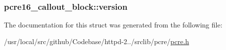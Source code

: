 \subsubsection[{\texorpdfstring{version}{version}}]{ pcre16\+\_\+callout\+\_\+block\+::version}\hypertarget{structpcre16__callout__block_a5b442eb1497b0b109598a4229a13ce49}{}\label{structpcre16__callout__block_a5b442eb1497b0b109598a4229a13ce49}


The documentation for this struct was generated from the following file\+:\begin{DoxyCompactItemize}
\item 
/usr/local/src/github/\+Codebase/httpd-\/2../srclib/pcre/\hyperlink{pcre_8h}{pcre.\+h}\end{DoxyCompactItemize}
